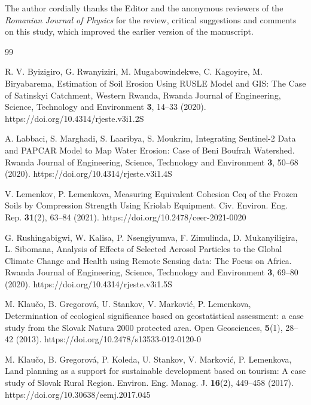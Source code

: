 \documentclass[myclassdoc,debug]{rjparticle}
\begin{document}
\printacronyms[name=List of Acronyms, heading=section]

\begin{acknowledgement}
The author cordially thanks the Editor and the anonymous reviewers of the \emph{Romanian Journal of Physics} for the review, critical suggestions and comments on this study, which improved the earlier version of the manuscript. 
\end{acknowledgement}

\begin{thebibliography}{99}

R. V. Byizigiro, G. Rwanyiziri, M. Mugabowindekwe, C. Kagoyire, M. Biryabarema, Estimation of Soil Erosion Using RUSLE Model and GIS: The Case of Satinskyi Catchment, Western Rwanda, Rwanda Journal of Engineering, Science, Technology and Environment \textbf{3}, 14--33 (2020). https://doi.org/10.4314/rjeste.v3i1.2S

A. Labbaci, S. Marghadi, S. Laaribya, S. Moukrim, Integrating Sentinel-2 Data and PAPCAR Model to Map Water Erosion: Case of Beni Boufrah Watershed. Rwanda Journal of Engineering, Science, Technology and Environment \textbf{3}, 50--68 (2020). https://doi.org/10.4314/rjeste.v3i1.4S

V. Lemenkov, P. Lemenkova, Measuring Equivalent Cohesion Ceq of the Frozen Soils by Compression Strength Using Kriolab Equipment. Civ. Environ. Eng. Rep. \textbf{31}(2), 63--84 (2021). https://doi.org/10.2478/ceer-2021-0020 

G. Rushingabigwi, W. Kalisa, P. Nsengiyumva, F. Zimulinda, D. Mukanyiligira, L. Sibomana, Analysis of Effects of Selected Aerosol Particles to the Global Climate Change and Health using Remote Sensing data: The Focus on Africa. Rwanda Journal of Engineering, Science, Technology and Environment \textbf{3}, 69--80 (2020). https://doi.org/10.4314/rjeste.v3i1.5S

M. Klau\v{c}o, B. Gregorov\'{a}, U. Stankov, V. Markovi\'{c}, P. Lemenkova, Determination of ecological significance based on geostatistical assessment: a case study from the Slovak Natura 2000 protected area. Open Geosciences, \textbf{5}(1), 28--42 (2013). https://doi.org/10.2478/s13533-012-0120-0

%
M. Klau\v{c}o, B. Gregorov\'{a}, P. Koleda, U. Stankov, V. Markovi\'{c}, P. Lemenkova, Land planning as a support for sustainable development based on tourism: A case study of Slovak Rural Region. Environ. Eng. Manag. J. \textbf{16}(2), 449--458 (2017). https://doi.org/10.30638/eemj.2017.045 


\end{thebibliography}
\end{document}
